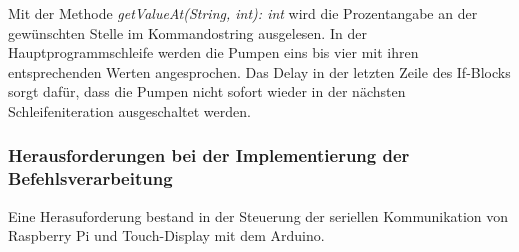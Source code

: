 
Mit der Methode \textit{getValueAt(String, int): int} wird die Prozentangabe an der gewünschten Stelle im Kommandostring ausgelesen. In der Hauptprogrammschleife werden die Pumpen eins bis vier mit ihren entsprechenden Werten angesprochen. Das Delay in der letzten Zeile des If-Blocks sorgt dafür, dass die Pumpen nicht sofort wieder in der nächsten Schleifeniteration ausgeschaltet werden.
\subsubsection{Herausforderungen bei der Implementierung der Befehlsverarbeitung}
Eine Herasuforderung bestand in der Steuerung der seriellen Kommunikation von Raspberry Pi und Touch-Display mit dem Arduino.
\endinput



